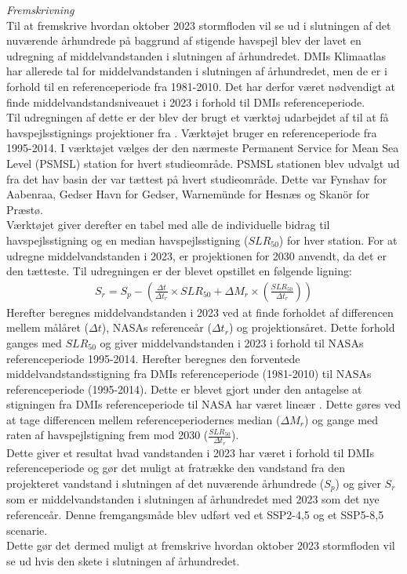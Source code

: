 {\large \textit{Fremskrivning}} \\
Til at fremskrive hvordan oktober 2023 stormfloden vil se ud i slutningen af det nuværende århundrede på baggrund af stigende havspejl blev der lavet en udregning af middelvandstanden i slutningen af århundredet. DMIs Klimaatlas har allerede tal for middelvandstanden i slutningen af århundredet, men de er i forhold til en referenceperiode fra 1981-2010. Det har derfor været nødvendigt at finde middelvandstandsniveauet i 2023 i forhold til DMIs referenceperiode. \\

Til udregningen af dette er der blev der brugt et værktøj udarbejdet af \cite{NASA_tool} til at få havspejlsstignings projektioner fra \cite{garner_ipcc_2021}. Værktøjet bruger en referenceperiode fra 1995-2014. I værktøjet vælges der den nærmeste Permanent Service for Mean Sea Level (PSMSL) station for hvert studieområde. PSMSL stationen blev udvalgt ud fra det hav basin der var tættest på hvert studieområde. Dette var Fynshav for Aabenraa, Gedser Havn for Gedser, Warnemünde for Hesnæs og Skanör for Præstø. \\

Værktøjet giver derefter en tabel med alle de individuelle bidrag til havspejlsstigning og en median havspejlsstigning ($SLR_{50}$) for hver station. For at udregne middelvandstanden i 2023, er projektionen for 2030 anvendt, da det er den tætteste. Til udregningen er der blevet opstillet en følgende ligning: 
\begin{align} \label{Equation: Vandstandsstigning calculation}
    S_r = S_p- \left( \frac{\Delta{t}}{\Delta{t_r}}\times SLR_{50} + \Delta{M_r} \times \left(\frac{SLR_{50}}{\Delta{t_r}}\right) \right)
\end{align}
Herefter beregnes middelvandstanden i 2023 ved at finde forholdet af differencen mellem målåret ($\Delta{t}$), NASAs referenceår ($\Delta{t_r}$) og projektionsåret. Dette forhold ganges med $SLR_{50}$ og giver middelvandstanden i 2023 i forhold til NASAs referenceperiode 1995-2014. Herefter beregnes den forventede middelvandstandsstigning fra DMIs referenceperiode (1981-2010) til NASAs referenceperiode (1995-2014). Dette er blevet gjort under den antagelse at stigningen fra DMIs referenceperiode til NASA har været lineær \citep{danish_meteorological_institute_dmi_2024}. Dette gøres ved at tage differencen mellem referenceperiodernes median ($\Delta{M_r}$) og gange med raten af havspejlstigning frem mod 2030 ($\frac{SLR_{50}}{\Delta{t_r}}$). \\
Dette giver et resultat hvad vandstanden i 2023 har været i forhold til DMIs referenceperiode og gør det muligt at fratrække den vandstand fra den projekteret vandstand i slutningen af det nuværende århundrede ($S_p$) og giver $S_r$ som er middelvandstanden i slutningen af århundredet med 2023 som det nye referenceår. Denne fremgangsmåde blev udført ved et SSP2-4,5 og et SSP5-8,5 scenarie.\\
Dette gør det dermed muligt at fremskrive hvordan oktober 2023 stormfloden vil se ud hvis den skete i slutningen af århundredet.

